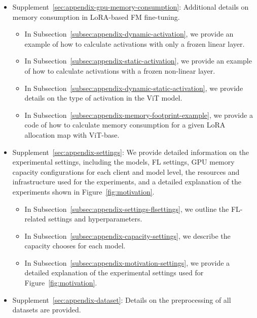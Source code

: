 \documentclass[sigconf]{acmart}
\begin{document}
\begin{itemize}
    \item Supplement~\ref{sec:appendix-gpu-memory-consumption}: Additional details on memory consumption in LoRA-based FM fine-tuning.
        \begin{itemize}
            \item In Subsection~\ref{subsec:appendix-dynamic-activation}, we provide an example of how to calculate activations with only a frozen linear layer.
            \item In Subsection~\ref{subsec:appendix-static-activation}, we provide an example of how to calculate activations with a frozen non-linear layer.
            \item In Subsection~\ref{subsec:appendix-dynamic-static-activation}, we provide details on the type of activation in the ViT model.
            \item In Subsection~\ref{subsec:appendix-memory-footprint-example}, we provide a code of how to calculate memory consumption for a given LoRA allocation map with ViT-base.
        \end{itemize}

    
    \item Supplement~\ref{sec:appendix-settings}: We provide detailed information on the experimental settings, including the models, FL settings, GPU memory capacity configurations for each client and model level, the resources and infrastructure used for the experiments, and a detailed explanation of the experiments shown in Figure~\ref{fig:motivation}.
        \begin{itemize}
            \item In Subsection~\ref{subsec:appendix-settings-flsettings}, we outline the FL-related settings and hyperparameters.
            \item In Subsection~\ref{subsec:appendix-capacity-settings}, we describe the capacity chooses for each model.
            \item In Subsection~\ref{subsec:appendix-motivation-settings}, we provide a detailed explanation of the experimental settings used for Figure~\ref{fig:motivation}.
        \end{itemize}
   
    \item Supplement~\ref{sec:appendix-dataset}: Details on the preprocessing of all datasets are provided.


\end{itemize}
\end{document}
